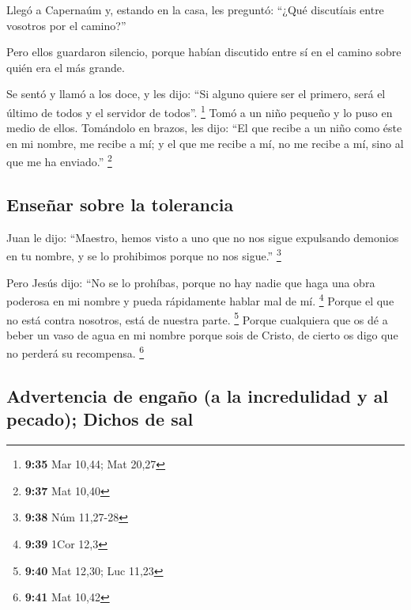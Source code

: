\begin{paracol}{2}
 Llegó a Capernaúm y, estando en la casa, les preguntó:
``¿Qué discutíais entre vosotros por el camino?''

 Pero ellos guardaron silencio, porque habían discutido
entre sí en el camino sobre quién era el más grande.

 Se sentó y llamó a los doce, y les dijo: ``Si alguno
quiere ser el primero, será el último de todos y el servidor de todos''.
\footnote{\textbf{9:35} Mar 10,44; Mat 20,27}  Tomó a un
niño pequeño y lo puso en medio de ellos. Tomándolo en brazos, les dijo:
 ``El que recibe a un niño como éste en mi nombre, me
recibe a mí; y el que me recibe a mí, no me recibe a mí, sino al que me
ha enviado.'' \footnote{\textbf{9:37} Mat 10,40}

\hypertarget{enseuxf1ar-sobre-la-tolerancia}{%
\subsection{Enseñar sobre la
tolerancia}\label{enseuxf1ar-sobre-la-tolerancia}}

 Juan le dijo: ``Maestro, hemos visto a uno que no nos
sigue expulsando demonios en tu nombre, y se lo prohibimos porque no nos
sigue.'' \footnote{\textbf{9:38} Núm 11,27-28}

 Pero Jesús dijo: ``No se lo prohíbas, porque no hay
nadie que haga una obra poderosa en mi nombre y pueda rápidamente hablar
mal de mí. \footnote{\textbf{9:39} 1Cor 12,3}  Porque el
que no está contra nosotros, está de nuestra parte. \footnote{\textbf{9:40}
  Mat 12,30; Luc 11,23}  Porque cualquiera que os dé a
beber un vaso de agua en mi nombre porque sois de Cristo, de cierto os
digo que no perderá su recompensa. \footnote{\textbf{9:41} Mat 10,42}

\hypertarget{advertencia-de-engauxf1o-a-la-incredulidad-y-al-pecado-dichos-de-sal}{%
\subsection{Advertencia de engaño (a la incredulidad y al pecado);
Dichos de
sal}\label{advertencia-de-engauxf1o-a-la-incredulidad-y-al-pecado-dichos-de-sal}}


\end{paracol}
